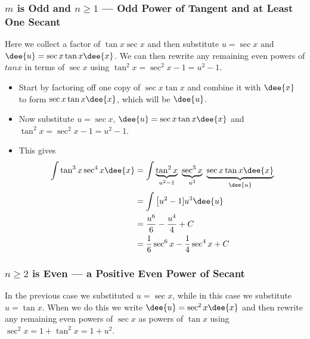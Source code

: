 \subsubsection*{$m$ is Odd and $n\geq 1$ --- Odd Power of Tangent and at Least One Secant}
Here we collect a factor of $\tan x \sec x$ and then substitute $u = \sec x$ and $\dee{u}
= \sec x \tan x \dee{x}$. We can then rewrite any remaining even powers of $tan
x$ in terms of $\sec x$ using $\tan^2x = \sec^2 x-1=u^2-1$.
\begin{eg}\label{eg:TRGINTf}
\soln
\begin{itemize}
 \item Start by factoring off one copy of $\sec x\tan x$ and combine it
with $\dee{x}$ to form $\sec x\tan x\dee{x}$, which will be $\dee{u}$.
\item Now substitute $u=\sec x$,
$\dee{u}=\sec x\tan x\dee{x}$ and $\tan^2x = \sec^2 x-1=u^2-1$.
\item This gives
\begin{align*}
\int \tan^3x \sec^4 x\dee{x}
&= \int \underbrace{\tan^2 x}_{u^2-1}\
        \underbrace{\sec^3 x}_{u^3}\
        \underbrace{\sec x\tan x\dee{x}}_{\dee{u}}  \\
&= \int \big[u^2-1]u^3\dee{u} \\
&=\frac{u^6}{6}-\frac{u^4}{4}+C \\
&=\frac{1}{6}\sec^6 x-\frac{1}{4}\sec^4 x + C
\end{align*}
\end{itemize}

\end{eg}

\subsubsection*{$n\geq 2$ is Even --- a Positive Even Power of Secant}
In the previous case we substituted $u = \sec x$, while in this case we substitute
$u=\tan x$. When we do this we write $\dee{u}=\sec^2 x \dee{x}$ and then rewrite
any remaining even powers of $\sec x$ as powers of $\tan x$ using $\sec^2x =
1+\tan^2x=1+u^2$.

